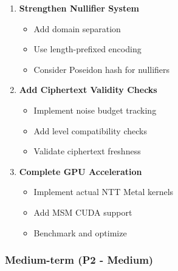 \documentclass[
]{article}
\providecommand{\tightlist}{%
  \setlength{\itemsep}{0pt}\setlength{\parskip}{0pt}}
\begin{document}
\begin{enumerate}
\def\labelenumi{\arabic{enumi}.}
\setcounter{enumi}{3}
\item
  \textbf{Strengthen Nullifier System}

  \begin{itemize}
  \tightlist
  \item
    Add domain separation
  \item
    Use length-prefixed encoding
  \item
    Consider Poseidon hash for nullifiers
  \end{itemize}
\item
  \textbf{Add Ciphertext Validity Checks}

  \begin{itemize}
  \tightlist
  \item
    Implement noise budget tracking
  \item
    Add level compatibility checks
  \item
    Validate ciphertext freshness
  \end{itemize}
\item
  \textbf{Complete GPU Acceleration}

  \begin{itemize}
  \tightlist
  \item
    Implement actual NTT Metal kernels
  \item
    Add MSM CUDA support
  \item
    Benchmark and optimize
  \end{itemize}
\end{enumerate}

\subsubsection{Medium-term (P2 - Medium)}\label{medium-term-p2---medium}
\end{document}
